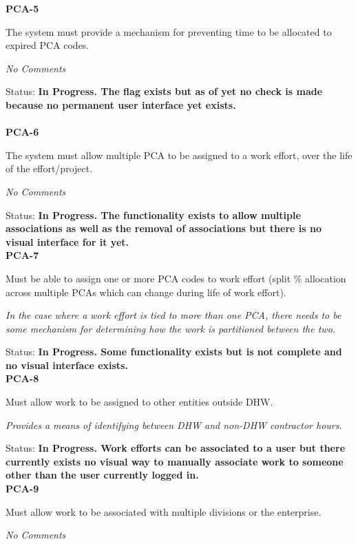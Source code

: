 \noindent \textbf{PCA-5}

\noindent The system must provide a mechanism for preventing time to be allocated to expired PCA codes.

\textit{No Comments}

\noindent Status: \textbf{In Progress.  The flag exists but as of yet no check is made because no permanent user interface yet exists.}\\
\\
\noindent \textbf{PCA-6}

\noindent The system must allow multiple PCA to be assigned to a work effort, over the life of the effort/project.

\textit{No Comments}

\noindent Status: \textbf{In Progress.  The functionality exists to allow multiple associations as well as the removal of associations but there is no visual interface for it yet.}\\

\noindent \textbf{PCA-7}

\noindent Must be able to assign one or more PCA codes to work effort (split \% allocation across multiple PCAs which can change during life of work effort).

\noindent \textit{In the case where a work effort is tied to more than one PCA, there needs to be some mechanism for determining how the work is partitioned between the two.}

\noindent Status: \textbf{In Progress.  Some functionality exists but is not complete and no visual interface exists.}\\

\noindent \textbf{PCA-8}

\noindent Must allow work to be assigned to other entities outside DHW.

\noindent \textit{Provides a means of identifying between DHW and non-DHW contractor hours.}

\noindent Status: \textbf{In Progress.   Work efforts can be associated to a user but there currently exists no visual way to manually associate work to someone other than the user currently logged in.}\\



\noindent \textbf{PCA-9}

\noindent Must allow work to be associated with multiple divisions or the enterprise.

\textit{No Comments}

